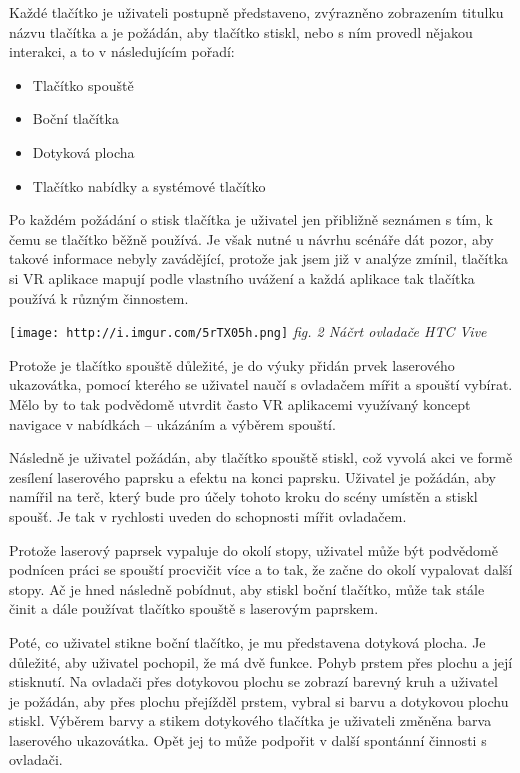 Každé tlačítko je uživateli postupně představeno, zvýrazněno zobrazením
titulku názvu tlačítka a je požádán, aby tlačítko stiskl, nebo s ním
provedl nějakou interakci, a to v následujícím pořadí:

\begin{itemize}
\tightlist
\item
  Tlačítko spouště
\item
  Boční tlačítka
\item
  Dotyková plocha
\item
  Tlačítko nabídky a systémové tlačítko
\end{itemize}

Po každém požádání o stisk tlačítka je uživatel jen přibližně seznámen s
tím, k čemu se tlačítko běžně používá. Je však nutné u návrhu scénáře
dát pozor, aby takové informace nebyly zavádějící, protože jak jsem již
v analýze zmínil, tlačítka si VR aplikace mapují podle vlastního uvážení
a každá aplikace tak tlačítka používá k různým činnostem.

\texttt{[image: http://i.imgur.com/5rTX05h.png]} \emph{fig. 2 Náčrt
ovladače HTC Vive}

Protože je tlačítko spouště důležité, je do výuky přidán prvek
laserového ukazovátka, pomocí kterého se uživatel naučí s ovladačem
mířit a spouští vybírat. Mělo by to tak podvědomě utvrdit často VR
aplikacemi využívaný koncept navigace v nabídkách -- ukázáním a výběrem
spouští.

Následně je uživatel požádán, aby tlačítko spouště stiskl, což vyvolá
akci ve formě zesílení laserového paprsku a efektu na konci paprsku.
Uživatel je požádán, aby namířil na terč, který bude pro účely tohoto
kroku do scény umístěn a stiskl spoušť. Je tak v rychlosti uveden do
schopnosti mířit ovladačem.

Protože laserový paprsek vypaluje do okolí stopy, uživatel může být
podvědomě podnícen práci se spouští procvičit více a to tak, že začne do
okolí vypalovat další stopy. Ač je hned následně pobídnut, aby stiskl
boční tlačítko, může tak stále činit a dále používat tlačítko spouště s
laserovým paprskem.

Poté, co uživatel stikne boční tlačítko, je mu představena dotyková
plocha. Je důležité, aby uživatel pochopil, že má dvě funkce. Pohyb
prstem přes plochu a její stisknutí. Na ovladači přes dotykovou plochu
se zobrazí barevný kruh a uživatel je požádán, aby přes plochu přejížděl
prstem, vybral si barvu a dotykovou plochu stiskl. Výběrem barvy a
stikem dotykového tlačítka je uživateli změněna barva laserového
ukazovátka. Opět jej to může podpořit v další spontánní činnosti s
ovladači.

